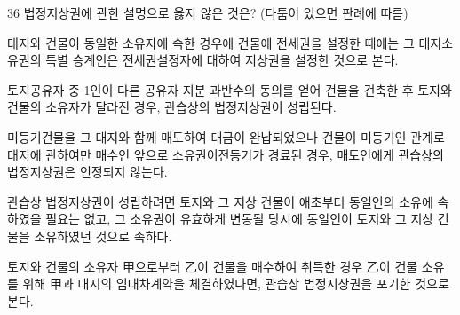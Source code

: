 \begin{question}{36}
법정지상권에 관한 설명으로 옳지 않은 것은? (다툼이 있으면 판례에 따름)
\begin{choices}
  \item 대지와 건물이 동일한 소유자에 속한 경우에 건물에 전세권을 설정한 때에는 그 대지소유권의 특별 승계인은 전세권설정자에 대하여 지상권을 설정한 것으로 본다.
  \item 토지공유자 중 1인이 다른 공유자 지분 과반수의 동의를 얻어 건물을 건축한 후 토지와 건물의 소유자가 달라진 경우, 관습상의 법정지상권이 성립된다.
  \item 미등기건물을 그 대지와 함께 매도하여 대금이 완납되었으나 건물이 미등기인 관계로 대지에 관하여만 매수인 앞으로 소유권이전등기가 경료된 경우, 매도인에게 관습상의 법정지상권은 인정되지 않는다.
  \item 관습상 법정지상권이 성립하려면 토지와 그 지상 건물이 애초부터 동일인의 소유에 속하였을 필요는 없고, 그 소유권이 유효하게 변동될 당시에 동일인이 토지와 그 지상 건물을 소유하였던 것으로 족하다.
  \item 토지와 건물의 소유자 甲으로부터 乙이 건물을 매수하여 취득한 경우 乙이 건물 소유를 위해 甲과 대지의 임대차계약을 체결하였다면, 관습상 법정지상권을 포기한 것으로 본다.
\end{choices}
\end{question}
